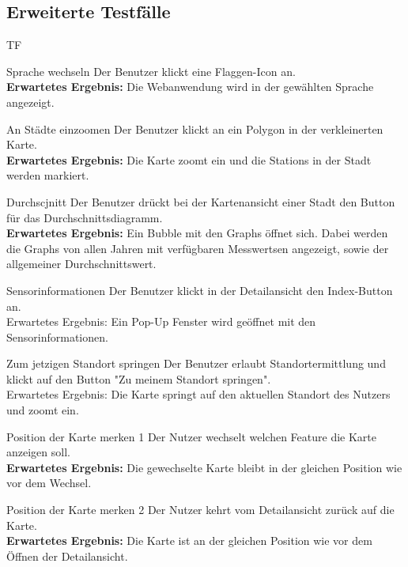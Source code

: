 \subsection{Erweiterte Testfälle}
\begin{Kriterien}{TF}
	
	\item[Sprache wechseln] Der Benutzer klickt eine Flaggen-Icon an. \\ \textbf{Erwartetes Ergebnis:} Die Webanwendung wird in der gewählten Sprache angezeigt.
	
	\item[An Städte einzoomen] Der Benutzer klickt an ein Polygon in der verkleinerten Karte. \\ \textbf{Erwartetes Ergebnis:} Die Karte zoomt ein und die \glspl{Station} in der Stadt werden markiert.
	
	\item[Durchscjnitt] Der Benutzer drückt bei der Kartenansicht einer Stadt den Button für das Durchschnittsdiagramm. \\ \textbf{Erwartetes Ergebnis:} Ein Bubble mit den \glspl{Graph} öffnet sich. Dabei werden die \glspl{Graph} von allen Jahren mit verfügbaren \glspl{Messwert}en angezeigt, sowie der allgemeiner Durchschnittswert.
	
	\item[Sensorinformationen] Der Benutzer klickt in der Detailansicht den Index-Button an. \\ Erwartetes Ergebnis: Ein Pop-Up Fenster
wird geöffnet mit den Sensorinformationen.

	\item[Zum jetzigen Standort springen] Der Benutzer erlaubt Standortermittlung und klickt auf den Button "Zu meinem Standort springen". \\ Erwartetes Ergebnis: Die Karte springt auf den aktuellen Standort des Nutzers und zoomt ein.
	
	\item[Position der Karte merken 1] Der Nutzer wechselt welchen Feature die Karte anzeigen soll. \\ 
	\textbf{Erwartetes Ergebnis:} Die gewechselte Karte bleibt in der gleichen Position wie vor dem Wechsel.
	
	\item[Position der Karte merken 2] Der Nutzer kehrt vom Detailansicht zurück auf die Karte. \\ 
	\textbf{Erwartetes Ergebnis:} Die Karte ist an der gleichen Position wie vor dem Öffnen der Detailansicht.
	
\end{Kriterien}
